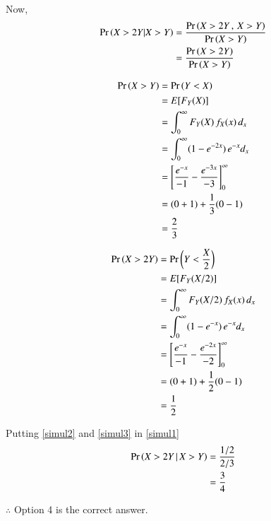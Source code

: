 \documentclass[journal,12pt,twocolumn]{IEEEtran}
\begin{document}
Now,
\begin{align}
    \Pr\left(X>2Y|X>Y\right) &= \dfrac{\Pr\left(X>2Y\,,\,X>Y\right) }{\Pr\left(X>Y\right)}\\
                  &= \dfrac{\Pr\left(X>2Y\right)}{\Pr\left(X>Y\right)} \label{simul1}
\end{align}


\begin{align}
    \Pr\left(X>Y\right) &= \Pr\left(Y<X\right)\\
             &= E[F_Y(X)]\\
             &= \int_0^\infty F_Y(X)\,f_X(x)\,d_x\\
             &= \int_0^\infty (1-e^{-2x})\,e^{-x}d_x\\
             &= \left[\frac{e^{-x}}{-1} - \frac{e^{-3x}}{-3}\right]_0^\infty\\
            &=(0+1)+\frac{1}{3}(0-1) \\
             &= \frac{2}{3} \label{simul2}
\end{align}


\begin{align}
    \Pr\left(X>2Y\right) &= \Pr\left(Y<\frac{X}{2}\right)\\
              &= E[F_Y(X/2)]\\
              &=  \int_0^\infty F_Y(X/2)\,f_X(x)\,d_x\\
              &= \int_{0}^{\infty}(1-e^{-x})\,e^{-x}d_x\\
              &= \left[\frac{e^{-x}}{-1} - \frac{e^{-2x}}{-2}\right]_0^\infty\\
              &= (0+1) + \frac{1}{2}(0-1)\\
              &= \frac{1}{2} \label{simul3}
\end{align}

Putting \eqref{simul2} and \eqref{simul3} in \eqref{simul1}
\begin{align}
    \Pr\left(X>2Y\,|\,X>Y\right) &= \frac{1/2}{2/3}\\
                  &= \frac{3}{4}
\end{align}

$\therefore$ Option 4 is the correct answer.
\end{document}
